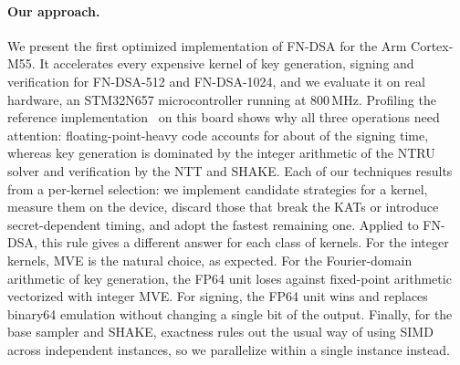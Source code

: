 \paragraph{Our approach.}
We present the first optimized implementation of FN-DSA for the Arm
Cortex-M55.
It accelerates every expensive kernel of key generation, signing and
verification for FN-DSA-512 and FN-DSA-1024, and we evaluate it on real
hardware, an STM32N657 microcontroller running at 800\,MHz.
Profiling the reference implementation~\cite{cfndsa} on this board shows
why all three operations need attention: floating-point-heavy code accounts
for about  of the signing time, whereas key generation is
dominated by the integer arithmetic of the NTRU solver and verification by
the NTT and SHAKE.
Each of our techniques results from a per-kernel selection: we implement
candidate strategies for a kernel, measure them on the device, discard those
that break the KATs or introduce secret-dependent timing, and adopt the
fastest remaining one.
Applied to FN-DSA, this rule gives a different answer for each class of
kernels.
For the integer kernels, MVE is the natural choice, as expected.
For the Fourier-domain arithmetic of key generation, the FP64 unit loses
against fixed-point arithmetic vectorized with integer MVE.
For signing, the FP64 unit wins and replaces binary64 emulation without
changing a single bit of the output.
Finally, for the base sampler and SHAKE, exactness rules out the usual way
of using SIMD across independent instances, so we parallelize within a
single instance instead.

